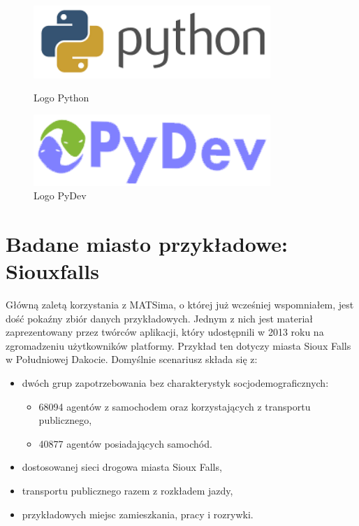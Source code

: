 \documentclass[twoside,12pt]{report}
\begin{document}
\begin{figure}[h]
\begin{flushleft}
	\begin{minipage}[]{.47\textwidth}
	\vspace*{30px}
	\centering
	\includegraphics[width=0.8\textwidth]{img/py}
	\caption{Logo Python\cite{python}}
	\end{minipage}%
\end{flushleft}
\begin{flushright}
	\begin{minipage}[]{.47\textwidth}
	\centering
	\includegraphics[width=0.8\textwidth]{img/pydev}
	\caption{Logo PyDev\cite{pydev}}
	\end{minipage}
\end{flushright}
\end{figure}

\section{Badane miasto przykładowe: Siouxfalls}

Główną zaletą korzystania z MATSima, o której już wcześniej wspomniałem, jest dość pokaźny zbiór danych przykładowych. Jednym z nich jest materiał zaprezentowany przez twórców aplikacji, który udostępnili w 2013 roku na zgromadzeniu użytkowników platformy\cite{siux}. Przykład ten dotyczy miasta Sioux Falls w Południowej Dakocie. Domyślnie scenariusz składa się z:

\begin{itemize}
\item dwóch grup zapotrzebowania bez charakterystyk socjodemograficznych:
\begin{itemize}
\item 68094 agentów z samochodem oraz korzystających z transportu publicznego,
\item 40877 agentów posiadających samochód.
\end{itemize}
\item dostosowanej sieci drogowa miasta Sioux Falls,
\item transportu publicznego razem z rozkładem jazdy,
\item przykładowych miejsc zamieszkania, pracy i rozrywki.
\end{itemize}
\end{document}
